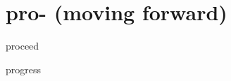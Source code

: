 \chapter{pro- (moving forward)}

\begin{word}{proceed}
\end{word}

\begin{word}{progress}
\end{word}